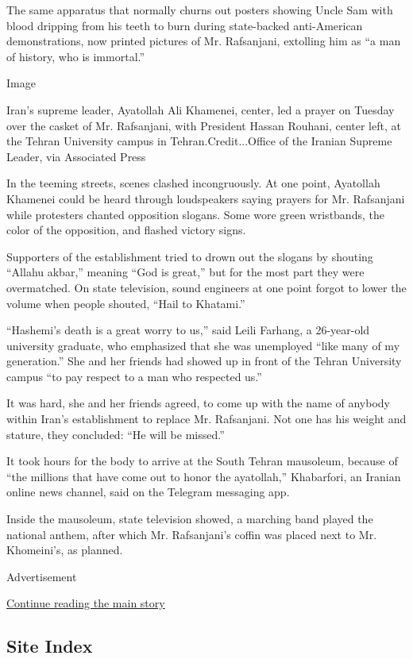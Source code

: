 The same apparatus that normally churns out posters showing Uncle Sam
with blood dripping from his teeth to burn during state-backed
anti-American demonstrations, now printed pictures of Mr. Rafsanjani,
extolling him as ``a man of history, who is immortal.''

Image

Iran's supreme leader, Ayatollah Ali Khamenei, center, led a prayer on
Tuesday over the casket of Mr. Rafsanjani, with President Hassan
Rouhani, center left, at the Tehran University campus in
Tehran.Credit...Office of the Iranian Supreme Leader, via Associated
Press

In the teeming streets, scenes clashed incongruously. At one point,
Ayatollah Khamenei could be heard through loudspeakers saying prayers
for Mr. Rafsanjani while protesters chanted opposition slogans. Some
wore green wristbands, the color of the opposition, and flashed victory
signs.

Supporters of the establishment tried to drown out the slogans by
shouting ``Allahu akbar,'' meaning ``God is great,'' but for the most
part they were overmatched. On state television, sound engineers at one
point forgot to lower the volume when people shouted, ``Hail to
Khatami.''

``Hashemi's death is a great worry to us,'' said Leili Farhang, a
26-year-old university graduate, who emphasized that she was unemployed
``like many of my generation.'' She and her friends had showed up in
front of the Tehran University campus ``to pay respect to a man who
respected us.''

It was hard, she and her friends agreed, to come up with the name of
anybody within Iran's establishment to replace Mr. Rafsanjani. Not one
has his weight and stature, they concluded: ``He will be missed.''

It took hours for the body to arrive at the South Tehran mausoleum,
because of ``the millions that have come out to honor the ayatollah,''
Khabarfori, an Iranian online news channel, said on the Telegram
messaging app.

Inside the mausoleum, state television showed, a marching band played
the national anthem, after which Mr. Rafsanjani's coffin was placed next
to Mr. Khomeini's, as planned.

Advertisement

\protect\hyperlink{after-bottom}{Continue reading the main story}

\hypertarget{site-index}{%
\subsection{Site Index}\label{site-index}}

